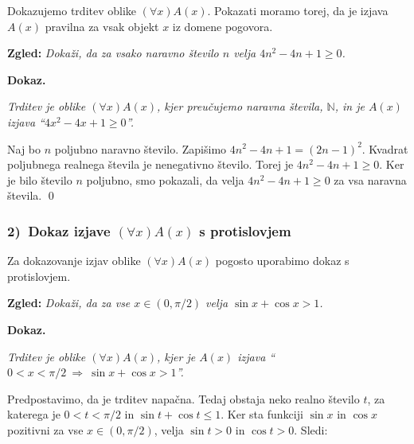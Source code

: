 \documentclass[11pt,paper=b5,footinclude,headinclude]{scrbook} %
\def\sledi {{~\Rightarrow~}}
\def\zgled{\noindent\textbf{\color{blue} Zgled: }}
\begin{document}
Dokazujemo trditev oblike $(\forall x)A(x)$.  Pokazati moramo torej, da je izjava $A(x)$
pravilna za vsak objekt $x$ iz domene pogovora.

\medskip
\zgled
\emph{ Dokaži, da za vsako naravno število $n$ velja $4n^2-4n+1\ge 0$.
}

\medskip \noindent\textbf{ Dokaz.}

\emph{ Trditev je oblike $(\forall x)A(x)$, kjer preučujemo naravna števila, $\mathbb{N}$, in je $A(x)$ izjava ``$4x^2 -4x+1 \ge 0$''.}

Naj bo $n$ poljubno naravno število. Zapišimo $4n^2 -4n+1 = (2n-1)^2$.
Kvadrat poljubnega realnega števila je nenegativno število.
Torej je $4n^2 -4n+1\ge 0$. Ker je bilo število $n$ poljubno, smo pokazali, da velja
 $4n^2-4n+1\ge 0$ za vsa naravna števila.
\qed

\medskip
\begin{center}
\end{center}


\subsubsection*{2)~Dokaz izjave $(\forall x)A(x)$ s protislovjem}

Za dokazovanje izjav oblike $(\forall x)A(x)$  pogosto uporabimo dokaz s protislovjem.

\medskip
\zgled
\emph{ Dokaži, da za vse $x\in (0,\pi/2)$ velja $\sin x+\cos x>1$.
}

\medskip \noindent\textbf{ Dokaz.}

\emph{ Trditev je oblike
$(\forall x)A(x)$, kjer je
$A(x)$ izjava ``$0<x<\pi/2\sledi \sin x+\cos x>1$''.}

Predpostavimo, da je trditev napačna.
Tedaj obstaja neko realno število $t$, za katerega je $0<t<\pi/2$ in $\sin t+\cos t\le 1$.
Ker sta funkciji $\sin x$ in $\cos x$ pozitivni za vse $x\in (0,\pi/2)$, velja $\sin t>0$ in $\cos t>0$.
Sledi:
\end{document}
